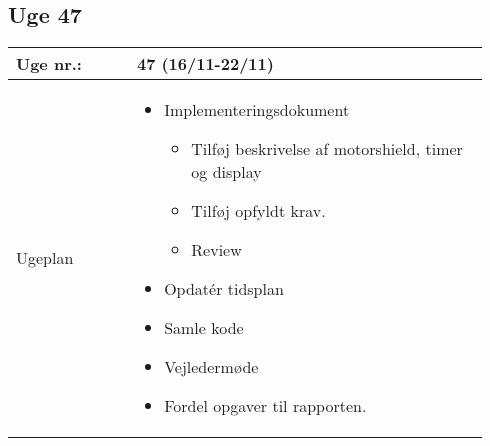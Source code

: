 	\subsection{Uge 47} \label{app:logUge47}
	\begin{longtable}{|p{0.24\linewidth}|p{0.7\linewidth}|}
		\hline
		Uge nr.: & 47 (16/11-22/11)\\ \hline
		Ugeplan & 
		\begin{itemize}
			\item Implementeringsdokument
			\begin{itemize}
				\item Tilføj beskrivelse af motorshield, timer og display
				\item Tilføj opfyldt krav. 
				\item Review
			\end{itemize}
			\item Opdatér tidsplan
			\item Samle kode 
			\item Vejledermøde
			\item Fordel opgaver til rapporten. 
		\end{itemize}
		

\end{longtable}
